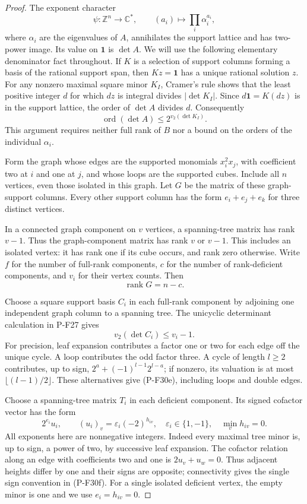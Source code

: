 \begin{proof}
The exponent character
\[
 \psi:\mathbb Z^n\longrightarrow\mathbb C^*,
 \qquad (a_i)\longmapsto\prod_i\alpha_i^{a_i},
\]
where $\alpha_i$ are the eigenvalues of $A$, annihilates
the support lattice and has two-power image. Its value
on $\mathbf1$ is $\det A$.
We will use the following elementary denominator fact
throughout. If $K$ is a selection of support columns
forming a basis of the rational support span, then
$Kz=\mathbf1$ has a unique rational solution $z$.
For any nonzero maximal square minor $K_I$, Cramer's
rule shows that the least positive integer $d$ for
which $dz$ is integral divides $|\det K_I|$.
Since $d\mathbf1=K(dz)$ is in the support lattice,
the order of $\det A$ divides $d$. Consequently
\[
 \operatorname{ord}(\det A)\le2^{v_2(\det K_I)}.
 \tag{P-F30c}
\]
This argument requires neither full rank of $B$
nor a bound on the orders of the individual $\alpha_i$.

Form the graph whose edges are the supported monomials
$x_i^2x_j$, with coefficient two at $i$ and one at $j$,
and whose loops are the supported cubes. Include all
$n$ vertices, even those isolated in this graph.
Let $G$ be the matrix of these graph-support columns.
Every other support column has the form
$e_i+e_j+e_k$ for three distinct vertices.

In a connected graph component on $v$ vertices,
a spanning-tree matrix has rank $v-1$. Thus the
graph-component matrix has rank $v$ or $v-1$.
This includes an isolated vertex: it has rank one
if its cube occurs, and rank zero otherwise.
Write $f$ for the number of full-rank components,
$c$ for the number of rank-deficient components,
and $v_i$ for their vertex counts. Then
\[
 \operatorname{rank}G=n-c.
 \tag{P-F30d}
\]

Choose a square support basis $C_i$ in each full-rank
component by adjoining one independent graph column
to a spanning tree. The unicyclic determinant
calculation in P-F27 gives
\[
 v_2(\det C_i)\le v_i-1.
 \tag{P-F30e}
\]
For precision, leaf expansion contributes a factor
one or two for each edge off the unique cycle.
A loop contributes the odd factor three.
A cycle of length $l\ge2$ contributes, up to sign,
$2^a+(-1)^{l-1}2^{l-a}$; if nonzero, its valuation
is at most $\lfloor(l-1)/2\rfloor$. These alternatives
give (P-F30e), including loops and double edges.

Choose a spanning-tree matrix $T_i$ in each deficient
component. Its signed cofactor vector has the form
\[
 2^{e_i}u_i,\qquad
 (u_i)_v=\varepsilon_i(-2)^{h_{iv}},
 \quad \varepsilon_i\in\{1,-1\},\quad
 \min_v h_{iv}=0.
 \tag{P-F30f}
\]
All exponents here are nonnegative integers.
Indeed every maximal tree minor is, up to sign,
a power of two, by successive leaf expansion.
The cofactor relation along an edge with
coefficients two and one is $2u_v+u_w=0$.
Thus adjacent heights differ by one and their
signs are opposite; connectivity gives the
single sign convention in (P-F30f).
For a single isolated deficient vertex, the
empty minor is one and we use $e_i=h_{iv}=0$.


\end{proof}
